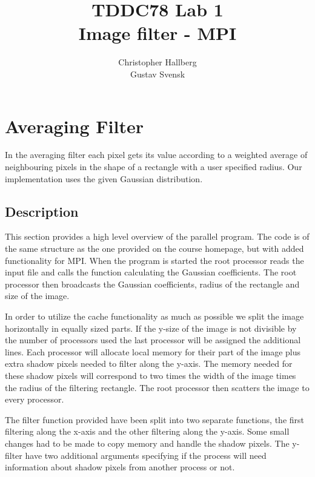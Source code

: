 \documentclass[a4paper, 12pt]{article}
\begin{document}
\title{TDDC78 Lab 1\\
        Image filter - MPI}
\author{Christopher Hallberg \\
        Gustav Svensk}
\maketitle

\thispagestyle{empty}

\newpage
\setcounter{page}{1}
\tableofcontents
\newpage

\section{Averaging Filter}
In the averaging filter each pixel gets its value according to a weighted average
of neighbouring pixels in the shape of a rectangle with a user specified radius. 
Our implementation uses the given Gaussian distribution.

\subsection{Description}
This section provides a high level overview of the parallel program. 
The code is of the same structure as the one provided on the course homepage,
but with added functionality for MPI. When the
program is started the root processor reads the input file and calls
the function calculating the Gaussian coefficients. The root processor then
broadcasts the Gaussian coefficients, radius of the rectangle and size of the image.


In order to utilize the cache functionality as much as possible we split the image
horizontally in equally sized parts. If the y-size of the image is not divisible
by the number of processors used the last processor will be assigned the
additional lines. Each processor will allocate local memory for their part of the
image plus extra shadow pixels needed to filter along the y-axis. The memory
needed for these shadow pixels will correspond to two times the width of the
image times the radius of the filtering rectangle. The root processor then 
scatters the image to every processor.  

The filter function provided have been split into two separate functions, the
first filtering along the x-axis and the other filtering along the y-axis. Some
small changes had to be made to copy memory and handle the shadow pixels. The
y-filter have two additional arguments specifying if the process will need
information about shadow pixels from another process or not. 
\end{document}

